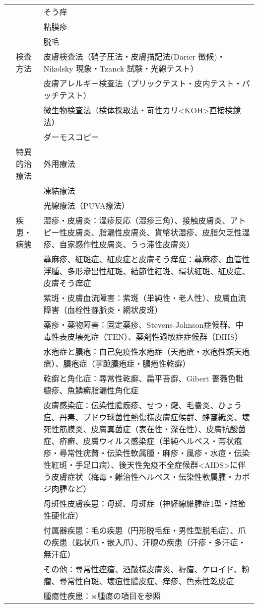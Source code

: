 \begin{xltabular}{\linewidth}{XXX}
 &  & そう痒 \\
 &  & 粘膜疹 \\
 &  & 脱毛 \\
 & 検査方法 & 皮膚検査法（硝子圧法・皮膚描記法(Darier 徴候)・Nikolsky 現象・Tzanck 試験・光線テスト） \\
 &  & 皮膚アレルギー検査法（プリックテスト・皮内テスト・パッチテスト） \\
 &  & 微生物検査法（検体採取法・苛性カリ<KOH>直接検鏡法） \\
 &  & ダーモスコピー \\
 & 特異的治療法 & 外用療法 \\
 &  & 凍結療法 \\
 &  & 光線療法（PUVA療法） \\
 & 疾患・病態 & 湿疹・皮膚炎：湿疹反応（湿疹三角）、接触皮膚炎、アトピー性皮膚炎、脂漏性皮膚炎、貨幣状湿疹、皮脂欠乏性湿疹、自家感作性皮膚炎、うっ滞性皮膚炎） \\
 &  & 蕁麻疹、紅斑症、紅皮症と皮膚そう痒症：蕁麻疹、血管性浮腫、多形滲出性紅斑、結節性紅斑、環状紅斑、紅皮症、皮膚そう痒症 \\
 &  & 紫斑・皮膚血流障害：紫斑（単純性・老人性）、皮膚血流障害（血栓性静脈炎・網状皮斑） \\
 &  & 薬疹・薬物障害：固定薬疹、Stevens-Johnson症候群、中毒性表皮壊死症（TEN）、薬剤性過敏症症候群（DIHS） \\
 &  & 水疱症と膿疱：自己免疫性水疱症（天疱瘡・水疱性類天疱瘡）、膿疱症（掌蹠膿疱症・膿疱性乾癬） \\
 &  & 乾癬と角化症：尋常性乾癬、扁平苔癬、Gibert 薔薇色粃糠疹、魚鱗癬脂漏性角化症 \\
 &  & 皮膚感染症：伝染性膿痂疹、せつ・癰、毛嚢炎、ひょう疽、丹毒、ブドウ球菌性熱傷様皮膚症候群、蜂窩織炎、壊死性筋膜炎、皮膚真菌症（表在性・深在性）、皮膚抗酸菌症、疥癬、皮膚ウィルス感染症（単純ヘルペス・帯状疱疹・尋常性疣贅・伝染性軟属腫・麻疹・風疹・水痘・伝染性紅斑・手足口病）、後天性免疫不全症候群<AIDS>に伴う皮膚症状（梅毒・難治性ヘルペス・伝染性軟属腫・カポジ肉腫など） \\
 &  & 母斑性皮膚疾患：母斑、母斑症（神経線維腫症1型・結節性硬化症） \\
 &  & 付属器疾患：毛の疾患（円形脱毛症・男性型脱毛症）、爪の疾患（匙状爪・嵌入爪）、汗腺の疾患（汗疹・多汗症・無汗症） \\
 &  & その他：尋常性痤瘡、酒皶様皮膚炎、褥瘡、ケロイド、粉瘤、尋常性白斑、壊疽性膿皮症、痒疹、色素性乾皮症 \\
 &  & 腫瘍性疾患：※腫瘍の項目を参照 \\

\end{xltabular}
